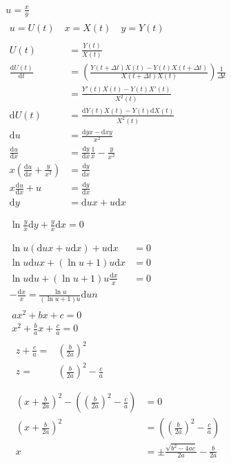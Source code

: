 \documentclass{article}
\newcommand\D[1]{\Delta{#1}}
\newcommand\F[2]{\frac{#1}{#2}}
\newcommand\di[1]{\text{d}#1}
\begin{document}
  \begin{gather*}
    u = \frac{x}{y} \\
    \begin{gathered}
      u = U(t) \quad x = X(t) \quad y = Y(t)
    \end{gathered} \\
    \begin{aligned}
      U(t) &= \F{Y(t)}{X(t)} \\
      \F{\di{U}(t)}{\di{t}} &= \left( \F{Y(t + \D{t})X(t) - Y(t)X(t + \D{t})}{X(t + \D{t})X(t)} \right) \F{1}{\D{t}} \\
      &= \F{Y'(t)X(t) - Y(t)X'(t)}{X^2(t)} \\
      \di{U}(t) &= \F{\di{Y}(t)X(t) - Y(t)\di{X}(t)}{X^2(t)} \\
      \di{u} & = \F{\di{y}x - \di{x}y}{x^{2}} \\
      \F{\di{u}}{\di{x}} &= \F{\di{y}}{\di{x}}\F{1}{x} - \F{y}{x^2} \\
      x\left( \F{\di{u}}{\di{x}} + \F{y}{x^2} \right) &= \F{\di{y}}{\di{x}} \\
      x\F{\di{u}}{\di{x}} + u &= \F{\di{y}}{\di{x}} \\
      \di{y} &= \di{u}x + u\di{x} \\
    \end{aligned} \\
    \begin{gathered}
      \ln{\F{y}{x}}\di{y} + \F{y}{x}\di{x} = 0 \\
    \end{gathered} \\
    \begin{aligned}
      \ln{u}(\di{u}x + u\di{x}) + u\di{x} &= 0 \\ 
      \ln{u}\di{u}x + ( \ln{u} + 1 ) u\di{x} &= 0 \\
      \ln{u}\di{u} + ( \ln{u} + 1 ) u\F{\di{x}}{x} &= 0 \\
      -\F{\di{x}}{x} = \F{\ln{u}}{\left( \ln{u} + 1 \right)u}\di{u}n
    \end{aligned}
  \end{gather*}
  \begin{gather*}
    ax^{2}+bx+c = 0 \\
    x^{2}+\frac{b}{a}x+\frac{c}{a} = 0 \\
    \begin{aligned}
      z+\frac{c}{a} =& \left(\frac{b}{2a}\right)^{2} \\
      z =& \left(\frac{b}{2a}\right)^{2} - \frac{c}{a} \\
    \end{aligned} \\
    \begin{aligned}
      \left(x + \frac{b}{2a}\right)^{2} - \left( \left(\frac{b}{2a}\right)^{2} - \frac{c}{a} \right) &= 0 \\
      \left(x + \frac{b}{2a}\right)^{2} &= \left( \left(\frac{b}{2a}\right)^{2} - \frac{c}{a} \right) \\
      x &= \pm\frac{\sqrt{b^{2}-4ac}}{2a} - \frac{b}{2a}
    \end{aligned}
  \end{gather*}
\end{document}
